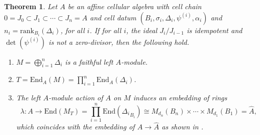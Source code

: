 \documentclass[oneside, a4paper, 11pt]{amsart}
\newtheorem{theorem}{Theorem}
\newcommand{\asym}{\widehat{A}}
\newcommand{\rank}{\mathrm{rank}}
\newcommand{\End}{\mathrm{End}}
\begin{document}
\begin{theorem}\label{TheoremDtext}
  Let $A$ be an affine cellular algebra with cell chain $0=J_0 \subset J_1 \subset \cdots \subset J_n=A$ and cell datum $(B_i,\sigma_i,\Delta_i, \psi^{(i)}, \alpha_i)$ and $n_i=\rank_{B_i}(\Delta_i)$, for all $i$.
If for all $i$, the ideal $J_i/J_{i-1}$ is idempotent and $\det(\psi^{(i)})$ is not a zero-divisor, then the following hold.
\begin{enumerate}
    \item $M=\bigoplus_{i=1}^n \Delta_i$ is a faithful left $A$-module.
    \item $T=\End_A(M)=\prod_{i=1}^n \End_A(\Delta_i)$.
    \item The left $A$-module action of $A$ on $M$ induces an embedding of rings
    $$\lambda: A \to \End(M_T) = \prod_{i=1}^n \End( {\Delta_i}_{B_i}) \cong M_{d_n}(B_n)\times \cdots \times M_{d_1}(B_1) = \asym,$$
    which coincides with the embedding of $A\to \asym$ as shown in \cite{CKLS}.
\end{enumerate} 
\end{theorem}
\end{document}
